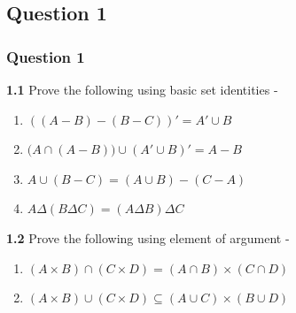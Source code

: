 \documentclass[xcolor=svgnames]{beamer}
\begin{document}
\subsection{Question 1}
\begin{frame}
\frametitle{Question 1}
\textbf{1.1} Prove the following using basic set identities - 
\begin{enumerate}
    \item $((A - B) - (B - C))' = A' \cup B$
    \item $\big(A \cap (A - B )\big)\cup(A' \cup B)'= A - B$
    \item $A \cup (B - C) = (A \cup B) - (C - A)$
    \item $A \Delta (B \Delta C) = (A \Delta B) \Delta C$
\end{enumerate}
\textbf{1.2} Prove the following using element of argument - 
\begin{enumerate}
    \item $(A \times B) \cap (C \times D) = (A \cap B) \times (C \cap D)$
    \item $(A \times B) \cup (C \times D) \subseteq (A \cup C) \times (B \cup D)$  
\end{enumerate}

\end{frame}

\end{document}
